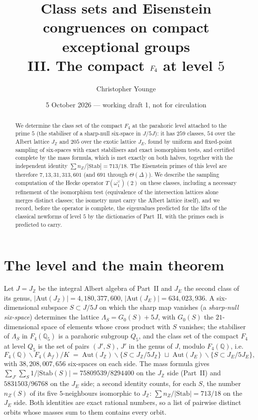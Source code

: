 \documentclass[11pt]{article}
\title{Class sets and Eisenstein congruences on compact exceptional groups\\ III. The compact $\Ff$ at level $5$}
\author{Christopher Younge}
\date{5 October 2026 --- working draft 1, not for circulation}
\theoremstyle{definition}\newtheorem{computation}[theorem]{Computation}\newtheorem{remark}[theorem]{Remark}\newtheorem{prediction}[theorem]{Prediction}
\newcommand{\Z}{\mathbb Z}\newcommand{\Q}{\mathbb Q}\newcommand{\F}{\mathbb F}\newcommand{\Ff}{F_4}\newcommand{\Aut}{\mathrm{Aut}}\newcommand{\Stab}{\mathrm{Stab}}
\begin{document}
\maketitle
\begin{abstract}
We determine the class set of the compact $\Ff$ at the parahoric level attached to the prime $5$ (the stabiliser of a sharp-null six-space in $J/5J$): it has $259$ classes, $54$ over the Albert lattice $J_\Z$ and $205$ over the exotic lattice $J_E$, found by uniform and fixed-point sampling of six-spaces with exact stabilisers and exact isomorphism tests, and certified complete by the mass formula, which is met exactly on both halves, together with the independent identity $\sum n_Z/|\Stab|=713/18$. The Eisenstein primes of this level are therefore $7,13,31,313,601$ (and $691$ through $\Theta(\Delta)$). We describe the sampling computation of the Hecke operator $T(\omega_1^\vee)(2)$ on these classes, including a necessary refinement of the isomorphism test (equivalence of the intersection lattices alone merges distinct classes; the isometry must carry the Albert lattice itself), and we record, before the operator is complete, the eigenvalues predicted for the lifts of the classical newforms of level $5$ by the dictionaries of Part~II, with the primes each is predicted to carry.
\end{abstract}

\section{The level and the main theorem}
Let $J=J_\Z$ be the integral Albert algebra of Part~II and $J_E$ the second class of its genus, $|\Aut(J_\Z)|=4{,}180{,}377{,}600$, $|\Aut(J_E)|=634{,}023{,}936$. A six-dimensional subspace $S\subset J/5J$ on which the sharp map vanishes (a \emph{sharp-null six-space}) determines the lattice $\Lambda_S=G_0(S)+5J$, with $G_0(S)$ the $21$-dimensional space of elements whose cross product with $S$ vanishes; the stabiliser of $\Lambda_S$ in $\Ff(\Q_5)$ is a parahoric subgroup $Q_5$, and the class set of the compact $\Ff$ at level $Q_5$ is the set of pairs $(J',S)$, $J'$ in the genus of $J$, modulo $\Ff(\Q)$, i.e.
\[\Ff(\Q)\backslash\Ff(\mathbb A_f)/K\;=\;\Aut(J_\Z)\backslash\{S\subset J_\Z/5J_\Z\}\;\sqcup\;\Aut(J_E)\backslash\{S\subset J_E/5J_E\},\]
with $38{,}208{,}007{,}656$ six-spaces on each side. The mass formula gives $\sum_{J'}\sum_S 1/|\Stab(S)|=75809539/8294400$ on the $J_\Z$ side (Part~II) and $5831503/96768$ on the $J_E$ side; a second identity counts, for each $S$, the number $n_Z(S)$ of its five $5$-neighbours isomorphic to $J_\Z$: $\sum n_Z/|\Stab|=713/18$ on the $J_E$ side. Both identities are exact rational numbers, so a list of pairwise distinct orbits whose masses sum to them contains every orbit.
\end{document}
